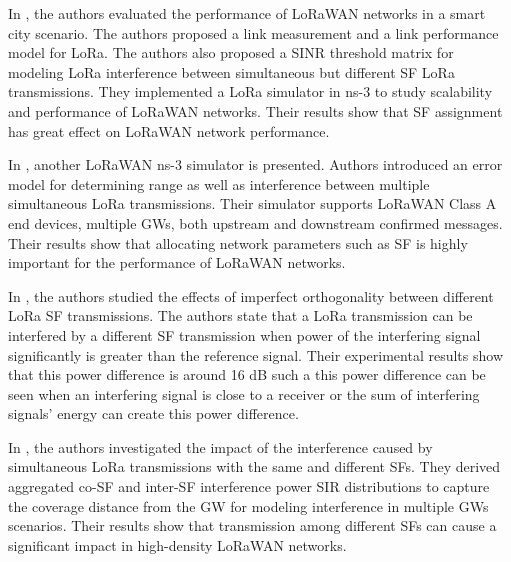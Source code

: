 \documentclass[conference]{IEEEtran}
\begin{document}
\par In \cite{7996384}, the authors evaluated the performance of LoRaWAN networks in a smart city scenario. The authors proposed a link measurement and a link performance model for LoRa. The authors also proposed a SINR threshold matrix for modeling LoRa interference between simultaneous but different SF LoRa transmissions. They implemented a LoRa simulator in ns-3 to study scalability and performance of LoRaWAN networks. Their results show that SF assignment has great effect on LoRaWAN network performance.

\par In \cite{8090518}, another LoRaWAN ns-3 simulator is presented. Authors introduced an error model for determining range as well as interference between multiple simultaneous LoRa transmissions. Their simulator supports LoRaWAN Class A end devices, multiple GWs, both upstream and downstream confirmed messages. Their results show that allocating network parameters such as SF is highly important for the performance of LoRaWAN networks.

\par In \cite{8267219}, the authors studied the effects of imperfect orthogonality between different LoRa SF transmissions. The authors state that a LoRa transmission can be interfered by a different SF transmission when power of the interfering signal significantly is greater than the reference signal. Their experimental results show that this power difference is around 16 dB such a this power difference can be seen when an interfering signal is close to a receiver or the sum of interfering signals' energy can create this power difference.

\par In \cite{8430542}, the authors investigated the impact of the interference caused by simultaneous LoRa transmissions with the same and different SFs. They derived aggregated co-SF and inter-SF interference power SIR distributions to capture the coverage distance from the GW for modeling interference in multiple GWs scenarios. Their results show that transmission among different SFs can cause a significant impact in high-density LoRaWAN networks.
\end{document}

